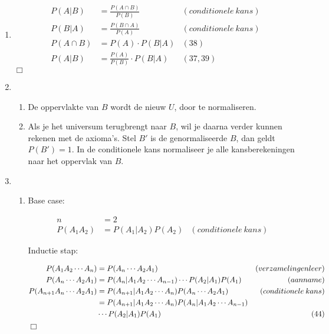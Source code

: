 \documentclass{article}
\begin{document}
\begin{enumerate}
\begin{enumerate}
        \end{enumerate}

    \item
        \begin{align}
            P(A|B) &= \frac{P(A \cap B)}{P(B)} & (conditionele\:kans)\\
            P(B|A) &= \frac{P(B \cap A)}{P(A)} & (conditionele\:kans)\\
            P(A \cap B) &= P(A) \cdot P(B|A) & (38)\\
            P(A|B) &= \frac{P(A)}{P(B)} \cdot P(B|A) & (37, 39)
        \end{align}
        $\Box$

    \item
        \begin{enumerate}
            \item
                De oppervlakte van $B$ wordt de nieuw $U$, door te normaliseren.

            \item
                Als je het universum terugbrengt naar $B$, wil je daarna verder
                kunnen rekenen met de axioma's. Stel $B'$ is de genormaliseerde
                $B$, dan geldt $P(B')=1$. In de conditionele kans normaliseer je
                alle kansberekeningen naar het oppervlak van $B$.

        \end{enumerate}

    \item
        \begin{enumerate}
            \item
                Base case:

                \begin{align}
                    n &= 2 &\\
                    P(A_1 A_2) &= P(A_1 | A_2) P(A_2) & (conditionele\:kans)
                \end{align}

                Inductie stap:

                \begin{align}
                    P(A_1 A_2 \cdots A_n) &= P(A_n \cdots A_2 A_1) &
                    (verzamelingenleer) \\
                    P(A_n \cdots A_2 A_1) &= P(A_n | A_1 A_2 \cdots A_{n-1})
                    \cdots P(A_2 | A_1) P(A_1) & (aanname) \\
                    P(A_{n+1} A_n \cdots A_2 A_1) &= P(A_{n+1} | A_1 A_2 \cdots
                    A_n) P(A_n \cdots A_2 A_1) & (conditionele\:kans) \\
                    &= P(A_{n+1} | A_1 A_2 \cdots A_n) P(A_n | A_1 A_2 \cdots
                    A_{n-1}) & \notag \\
                             & \cdots P(A_2 | A_1) P(A_1) & (44)
                \end{align}
                $\Box$


\end{enumerate}
\end{enumerate}
\end{document}
